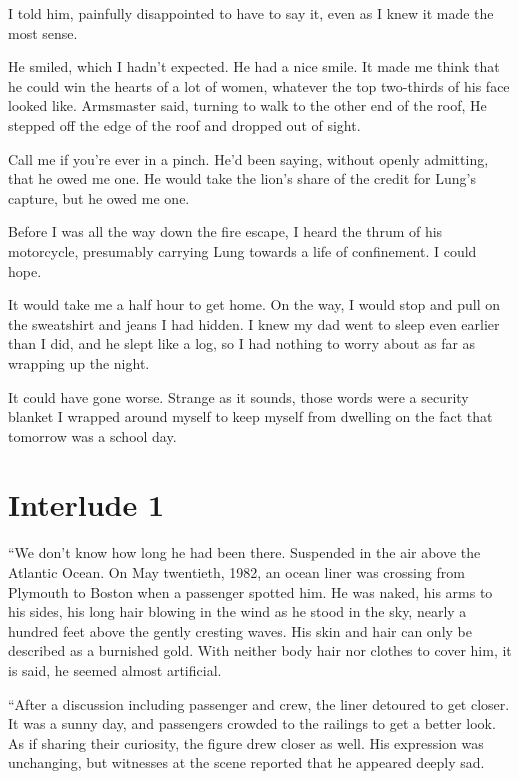  I told him, painfully disappointed to have to say it, even as I knew it made the most sense.

He smiled, which I hadn't expected. He had a nice smile. It made me think that he could win the hearts of a lot of women, whatever the top two-thirds of his face looked like.  Armsmaster said, turning to walk to the other end of the roof,  He stepped off the edge of the roof and dropped out of sight.

Call me if you're ever in a pinch. He'd been saying, without openly admitting, that he owed me one. He would take the lion's share of the credit for Lung's capture, but he owed me one.

Before I was all the way down the fire escape, I heard the thrum of his motorcycle, presumably carrying Lung towards a life of confinement. I could hope.

It would take me a half hour to get home. On the way, I would stop and pull on the sweatshirt and jeans I had hidden. I knew my dad went to sleep even earlier than I did, and he slept like a log, so I had nothing to worry about as far as wrapping up the night.

It could have gone worse. Strange as it sounds, those words were a security blanket I wrapped around myself to keep myself from dwelling on the fact that tomorrow was a school day.


\chapter{Interlude 1}

“We don't know how long he had been there. Suspended in the air above the Atlantic Ocean. On May twentieth, 1982, an ocean liner was crossing from Plymouth to Boston when a passenger spotted him. He was naked, his arms to his sides, his long hair blowing in the wind as he stood in the sky, nearly a hundred feet above the gently cresting waves. His skin and hair can only be described as a burnished gold. With neither body hair nor clothes to cover him, it is said, he seemed almost artificial.

“After a discussion including passenger and crew, the liner detoured to get closer. It was a sunny day, and passengers crowded to the railings to get a better look. As if sharing their curiosity, the figure drew closer as well. His expression was unchanging, but witnesses at the scene reported that he appeared deeply sad.

